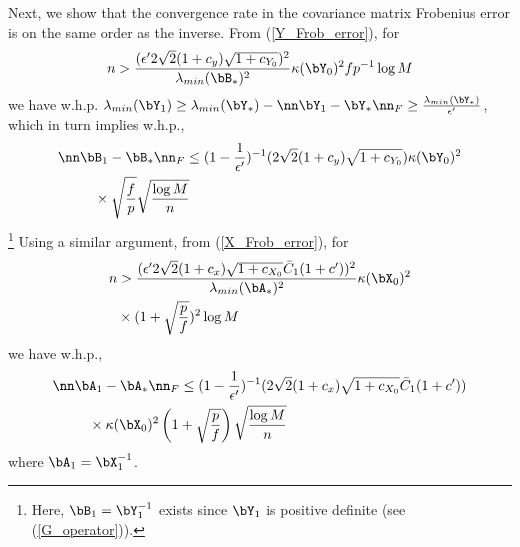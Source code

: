 \begin{IEEEproof}
Next, we show that the convergence rate in the covariance matrix Frobenius error is on the same order as the inverse. From (\ref{Y_Frob_error}), for
\begin{equation}
	n>\frac{ (\epsilon' 2\sqrt{2} (1+c_y)\sqrt{1+c_{Y_0}})^2}{\lambda_{min}(\bB_*)^2} \kappa(\bY_0)^2 fp^{-1} \log M
\end{equation}
we have w.h.p. $\lambda_{min}(\bY_1) \geq \lambda_{min}(\bY_*)-\nn \bY_1-\bY_* \nn_F\geq \frac{\lambda_{min}(\bY_*)}{\epsilon'}$, which in turn implies w.h.p.,
\begin{align}
	\nn & \bB_1-\bB_* \nn_F \leq (1-\frac{1}{\epsilon'})^{-1} (2\sqrt{2} (1+c_y)\sqrt{1+c_{Y_0}}) \kappa(\bY_0)^2 \nonumber \\
		&\quad \times \sqrt{\frac{f}{p}} \sqrt{\frac{\log M}{n}} \label{B1_Frob_error}
\end{align}
\footnote{Here, $\bB_1 = \bY_1^{-1}$ exists since $\bY_1$ is positive definite (see (\ref{G_operator})).}
Using a similar argument, from (\ref{X_Frob_error}), for 
\begin{align*}
	n &>\frac{(\epsilon' 2\sqrt{2}(1+c_x)\sqrt{1+c_{X_0}} \bar{C}_1(1+c'))^2}{\lambda_{min}(\bA_*)^2} \kappa(\bX_0)^2 \\
		&\times (1+\sqrt{\frac{p}{f}})^2 \log M
\end{align*}
we have w.h.p.,
\begin{align}
	\nn &\bA_1-\bA_* \nn_F \leq (1-\frac{1}{\epsilon'})^{-1} (2\sqrt{2}(1+c_x)\sqrt{1+c_{X_0}} \bar{C}_1(1+c')) \nonumber \\
		&\quad \times \kappa(\bX_0)^2 \left(1+\sqrt{\frac{p}{f}}\right) \sqrt{\frac{\log M}{n}} \label{A1_Frob_error}
\end{align}
where $\bA_1=\bX_1^{-1}$.


\end{IEEEproof}

